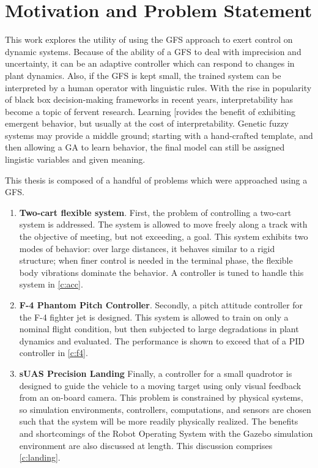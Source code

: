 \section{Motivation and Problem Statement}
This work explores the utility of using the GFS approach to exert control on dynamic systems. Because of the
ability of a GFS to deal with imprecision and uncertainty, it can be an adaptive controller which can respond
to changes in plant dynamics. Also, if the GFS is kept small, the trained system can be interpreted by a human
operator with linguistic rules. With the rise in popularity of black box decision-making frameworks in recent
years, interpretability has become a topic of fervent
research\cite{ribeiro2016should,lipton2016mythos,zeiler2014visualizing,dong2017improving}. Learning [rovides
the benefit of exhibiting emergent behavior, but usually at the cost of interpretability. Genetic fuzzy
systems may provide a middle ground; starting with a hand-crafted template, and then allowing a GA to learn
behavior, the final model can still be assigned lingistic variables and given meaning. 

This thesis is composed of a handful of problems which were approached using a GFS.
\begin{enumerate}
    \item {\bf Two-cart flexible system}. First, the problem of controlling a two-cart system is addressed.
        The system is allowed to move freely along a track with the objective of meeting, but not exceeding, a
        goal. This system exhibits two modes of behavior: over large distances, it behaves similar to a rigid
        structure; when finer control is needed in the terminal phase, the flexible body vibrations dominate
        the behavior. A controller is tuned to handle this system in \cref{c:acc}.

    \item {\bf F-4 Phantom Pitch Controller}. Secondly, a pitch attitude controller for the F-4 fighter jet is
        designed. This system is allowed to train on only a nominal flight condition, but then subjected to
        large degradations in plant dynamics and evaluated. The performance is shown to exceed that of a PID
        controller in \cref{c:f4}.

    \item {\bf sUAS Precision Landing} Finally, a controller for a small quadrotor is designed to guide the
        vehicle to a moving target using only visual feedback from an on-board camera. This problem is
        constrained by physical systems, so simulation environments, controllers, computations, and sensors
        are chosen such that the system will be more readily physically realized. The benefits and
        shortcomings of the Robot Operating System with the Gazebo simulation environment are also discussed
        at length. This discussion comprises \cref{c:landing}.
\end{enumerate}

